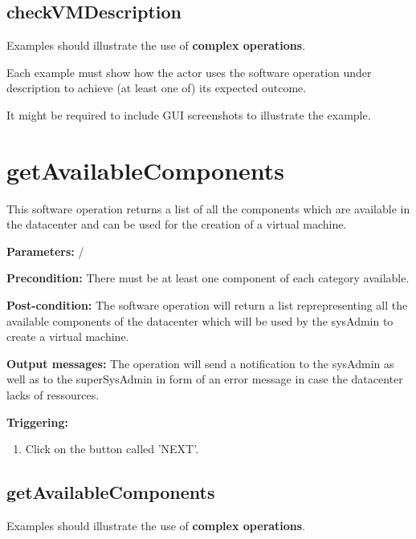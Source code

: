 \subsection{checkVMDescription}
Examples should illustrate the use of \textbf{complex operations}.

Each example must show how the actor uses the software operation under
description to achieve (at least one of) its expected outcome.

It might be required to include GUI screenshots to illustrate the example.








\section{getAvailableComponents}
\label{operation:getAvailableComponents}
This software operation returns a list of all the components which are available
in the datacenter and can be used for the creation of a virtual machine.
\begin{description}

\item \textbf{Parameters:} /
\item \textbf{Precondition:} There must be at least one component of each
category available.
\item \textbf{Post-condition:} The software operation will return a list
reprepresenting all the available components of the datacenter which will be
used by the sysAdmin to create a virtual machine.
\item \textbf{Output messages:} The operation will send a notification to the
sysAdmin as well as to the superSysAdmin in form of an error message in case the
datacenter lacks of ressources.

\item \textbf{Triggering:}
\begin{enumerate}
\item Click on the button called 'NEXT'.
\end{enumerate}

 
\end{description}

\subsection{getAvailableComponents}
Examples should illustrate the use of \textbf{complex operations}.

